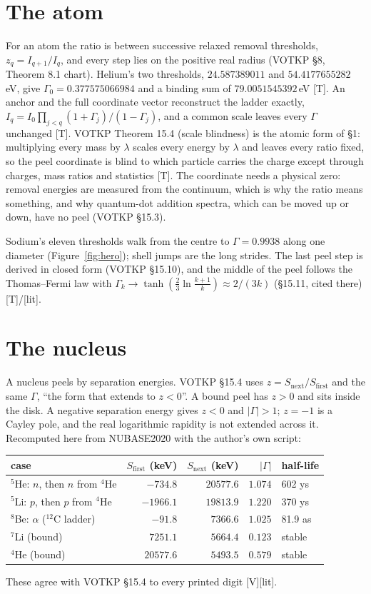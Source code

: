 \documentclass[11pt]{article}
\theoremstyle{definition}
\newcommand{\grade}[1]{\textsf{\small[#1]}}
\begin{document}
\section{The atom}
For an atom the ratio is between successive relaxed removal thresholds, $z_q=I_{q+1}/I_q$, and every step lies on the positive real radius (VOTKP §8, Theorem 8.1 chart). Helium's two thresholds, $24.587389011$ and $54.4177655282$\,eV, give $\Gamma_0=0.377575066984$ and a binding sum of $79.0051545392$\,eV \grade{T}. An anchor and the full coordinate vector reconstruct the ladder exactly, $I_q=I_0\prod_{j<q}(1+\Gamma_j)/(1-\Gamma_j)$, and a common scale leaves every $\Gamma$ unchanged \grade{T}. VOTKP Theorem 15.4 (scale blindness) is the atomic form of §1: multiplying every mass by $\lambda$ scales every energy by $\lambda$ and leaves every ratio fixed, so the peel coordinate is blind to which particle carries the charge except through charges, mass ratios and statistics \grade{T}. The coordinate needs a physical zero: removal energies are measured from the continuum, which is why the ratio means something, and why quantum-dot addition spectra, which can be moved up or down, have no peel (VOTKP §15.3).

Sodium's eleven thresholds walk from the centre to $\Gamma=0.9938$ along one diameter (Figure~\ref{fig:hero}); shell jumps are the long strides. The last peel step is derived in closed form (VOTKP §15.10), and the middle of the peel follows the Thomas–Fermi law with $\Gamma_k\to\tanh(\tfrac23\ln\tfrac{k+1}{k})\approx2/(3k)$ (§15.11, cited there) \grade{T}/\grade{lit}.

\section{The nucleus}
A nucleus peels by separation energies. VOTKP §15.4 uses $z=S_{\mathrm{next}}/S_{\mathrm{first}}$ and the same $\Gamma$, ``the form that extends to $z<0$''. A bound peel has $z>0$ and sits inside the disk. A negative separation energy gives $z<0$ and $|\Gamma|>1$; $z=-1$ is a Cayley pole, and the real logarithmic rapidity is not extended across it. Recomputed here from NUBASE2020 with the author's own script:

\begin{center}
\begin{tabular}{lrrrl}\toprule
case & $S_{\mathrm{first}}$ (keV) & $S_{\mathrm{next}}$ (keV) & $|\Gamma|$ & half-life\\\midrule
${}^5$He: $n$, then $n$ from ${}^4$He & $-734.8$ & $20577.6$ & $1.074$ & 602 ys\\
${}^5$Li: $p$, then $p$ from ${}^4$He & $-1966.1$ & $19813.9$ & $1.220$ & 370 ys\\
${}^8$Be: $\alpha$ ($^{12}$C ladder) & $-91.8$ & $7366.6$ & $1.025$ & 81.9 as\\
${}^7$Li (bound) & $7251.1$ & $5664.4$ & $0.123$ & stable\\
${}^4$He (bound) & $20577.6$ & $5493.5$ & $0.579$ & stable\\\bottomrule
\end{tabular}
\end{center}
\noindent These agree with VOTKP §15.4 to every printed digit \grade{V}\grade{lit}.
\end{document}
